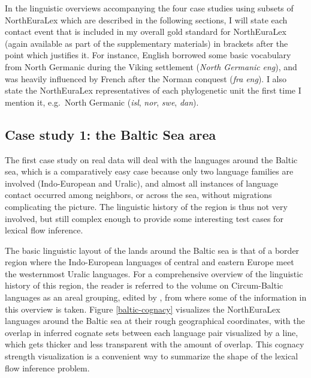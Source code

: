 In the linguistic overviews accompanying the four case studies using subsets of NorthEuraLex which are described in the following sections, I will state each contact event that is included in my overall gold standard for NorthEuraLex (again available as part of the supplementary materials) in brackets after the point which justifies it. For instance, English borrowed some basic vocabulary from North Germanic during the Viking settlement (\textit{North Germanic} \arrowOA \textit{eng}), and was heavily influenced by French after the Norman conquest (\textit{fra} \arrowOA \textit{eng}). I also state the NorthEuraLex representatives of each phylogenetic unit the first time I mention it, e.g.\ North Germanic (\textit{isl}, \textit{nor}, \textit{swe}, \textit{dan}).

\subsection{Case study 1: the Baltic Sea area}
The first case study on real data will deal with the languages around the Baltic sea, which is a comparatively easy case because only two language families are involved (Indo-European and Uralic), and almost all instances of language contact occurred among neighbors, or across the sea, without migrations complicating the picture. The linguistic history of the region is thus not very involved, but still complex enough to provide some interesting test cases for lexical flow inference.

The basic linguistic layout of the lands around the Baltic sea is that of a border region where the Indo-European languages of central and eastern Europe meet the westernmost Uralic languages. For a comprehensive overview of the linguistic history of this region, the reader is referred to the volume on Circum-Baltic languages as an areal grouping, edited by \cite{dahl_koptjevskaja-tamm_2001}, from where some of the information in this overview is taken. Figure \ref{baltic-cognacy} visualizes the NorthEuraLex languages around the Baltic sea at their rough geographical coordinates, with the overlap in inferred cognate sets between each language pair visualized by a line, which gets thicker and less transparent with the amount of overlap. This cognacy strength visualization is a convenient way to summarize the shape of the lexical flow inference problem.

